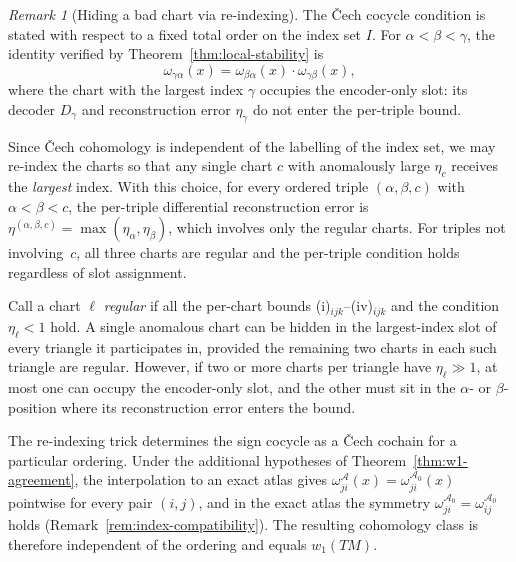 \documentclass[11pt]{article}
\theoremstyle{plain}
\theoremstyle{definition}
\theoremstyle{remark}
\newtheorem{remark}[theorem]{Remark}
\begin{document}
\begin{remark}[Hiding a bad chart via re-indexing]\label{rem:reindexing}
The \v{C}ech cocycle condition is stated with respect to a fixed total order on the index set $I$. For $\alpha < \beta < \gamma$, the identity verified by Theorem~\ref{thm:local-stability} is
\[
\omega_{\gamma\alpha}(x) = \omega_{\beta\alpha}(x) \cdot \omega_{\gamma\beta}(x),
\]
where the chart with the largest index $\gamma$ occupies the encoder-only slot: its decoder $D_\gamma$ and reconstruction error $\eta_\gamma$ do not enter the per-triple bound.
 
Since \v{C}ech cohomology is independent of the labelling of the index set, we may re-index the charts so that any single chart $c$ with anomalously large $\eta_c$ receives the \emph{largest} index. With this choice, for every ordered triple $(\alpha, \beta, c)$ with $\alpha < \beta < c$, the per-triple differential reconstruction error is $\eta^{(\alpha,\beta,c)} = \max(\eta_\alpha, \eta_\beta)$, which involves only the regular charts. For triples not involving~$c$, all three charts are regular and the per-triple condition holds regardless of slot assignment.
 
Call a chart $\ell$ \emph{regular} if all the per-chart bounds (i)$_{ijk}$--(iv)$_{ijk}$ and the condition $\eta_\ell < 1$ hold. A single anomalous chart can be hidden in the largest-index slot of every triangle it participates in, provided the remaining two charts in each such triangle are regular. However, if two or more charts per triangle have $\eta_\ell \gg 1$, at most one can occupy the encoder-only slot, and the other must sit in the $\alpha$- or $\beta$-position where its reconstruction error enters the bound.
 
The re-indexing trick determines the sign cocycle as a \v{C}ech cochain for a particular ordering. Under the additional hypotheses of Theorem~\ref{thm:w1-agreement}, the interpolation to an exact atlas gives $\omega_{ji}^{\mathcal{A}}(x) = \omega_{ji}^{\mathcal{A}_0}(x)$ pointwise for every pair $(i,j)$, and in the exact atlas the symmetry $\omega_{ji}^{\mathcal{A}_0} = \omega_{ij}^{\mathcal{A}_0}$ holds (Remark~\ref{rem:index-compatibility}). The resulting cohomology class is therefore independent of the ordering and equals $w_1(TM)$.
\end{remark}
\end{document}
